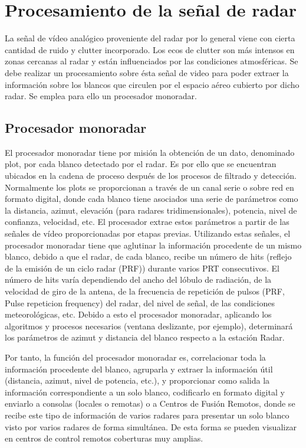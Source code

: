 \section{Procesamiento de la señal de radar}

La señal de vídeo analógico proveniente del radar por lo general viene con cierta cantidad de ruido y clutter incorporado. Los ecos de clutter son más intensos en zonas cercanas al radar y están influenciados por las condiciones atmosféricas. Se debe realizar un procesamiento sobre ésta señal de video para poder extraer la información sobre los blancos que circulen por el espacio aéreo cubierto por dicho radar. Se emplea para ello un procesador monoradar.

\subsection{Procesador monoradar}


El procesador monoradar tiene por misión la obtención de un dato, denominado plot, por cada blanco detectado por el radar. Es por ello que se encuentran ubicados en la cadena de proceso después de los procesos de filtrado  y detección. Normalmente los plots se proporcionan a través de un canal serie o sobre red en formato digital, donde cada blanco tiene asociados una serie de parámetros como la distancia, azimut, elevación (para radares tridimensionales), potencia, nivel de confianza, velocidad, etc. El procesador extrae estos parámetros a partir de las señales de vídeo proporcionadas por etapas previas. Utilizando estas señales, el procesador monoradar tiene que aglutinar la información procedente de un mismo blanco, debido a que el radar, de cada blanco, recibe un número de hits (reflejo de la emisión de un ciclo radar (PRF)) durante varios PRT consecutivos. El número de hits varía dependiendo del ancho del lóbulo de radiación, de la velocidad de giro de la antena, de la frecuencia de repetición de pulsos (PRF, Pulse repeticion frequency) del radar, del nivel de señal, de las condiciones meteorológicas, etc. Debido a esto el procesador monoradar, aplicando los algoritmos y procesos necesarios (ventana deslizante, por ejemplo), determinará los parámetros de azimut y distancia del blanco respecto a la estación Radar.


Por tanto, la función del procesador monoradar es, correlacionar toda la información procedente del blanco, agruparla y extraer la información útil (distancia, azimut, nivel de potencia, etc.), y proporcionar como salida la información correspondiente a un solo blanco, codificarlo en formato digital y enviarlo a consolas (locales o remotas) o a Centros de Fusión Remotos, donde se recibe este tipo de información de varios radares para presentar un solo blanco visto por varios radares de forma simultánea. De esta forma se pueden visualizar en centros de control remotos coberturas muy amplias.




